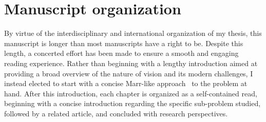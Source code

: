 \section{Manuscript organization}
By virtue of the interdisciplinary and international organization of my thesis, this manuscript is longer than most manuscripts have a right to be. Despite this length, a concerted effort has been made to ensure a smooth and engaging reading experience. Rather than beginning with a lengthy introduction aimed at providing a broad overview of the nature of vision and its modern challenges, I instead elected to start with a concise Marr-like approach~\cite{marr1982vision}  to the problem at hand. After this introduction, each chapter is organized as a self-contained read, beginning with a concise introduction regarding the specific sub-problem studied, followed by a related article, and concluded with research perspectives. 

